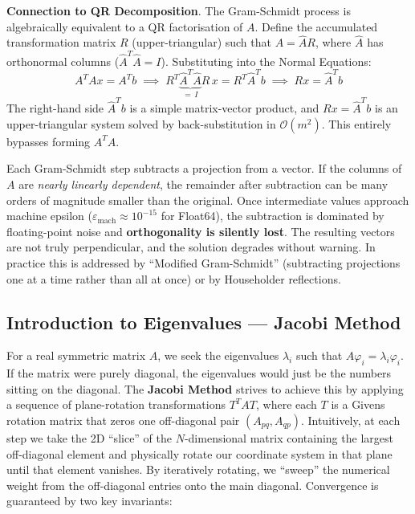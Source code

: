 \documentclass[12pt, a4paper]{article}
\begin{document}
\textbf{Connection to QR Decomposition}. The Gram-Schmidt process is algebraically equivalent to a QR factorisation of $A$. Define the accumulated transformation matrix $R$ (upper-triangular) such that $A = \hat{A} R$, where $\hat{A}$ has orthonormal columns ($\hat{A}^T \hat{A} = I$). Substituting into the Normal Equations:
\begin{equation}
A^T A x = A^T b \;\implies\; R^T \underbrace{\hat{A}^T \hat{A}}_{=\, I} R\, x = R^T \hat{A}^T b \;\implies\; Rx = \hat{A}^T b
\end{equation}
The right-hand side $\hat{A}^T b$ is a simple matrix-vector product, and $Rx = \hat{A}^T b$ is an upper-triangular system solved by back-substitution in $\mathcal{O}(m^2)$. This entirely bypasses forming $A^T A$.

\begin{tcolorbox}[colback=orange!5!white,colframe=orange!75!black,title=Numerical Stability Warning: Loss of Orthogonality]
Each Gram-Schmidt step subtracts a projection from a vector. If the columns of $A$ are \textit{nearly linearly dependent}, the remainder after subtraction can be many orders of magnitude smaller than the original. Once intermediate values approach machine epsilon ($\varepsilon_{\text{mach}} \approx 10^{-15}$ for Float64), the subtraction is dominated by floating-point noise and \textbf{orthogonality is silently lost}. The resulting vectors are not truly perpendicular, and the solution degrades without warning. In practice this is addressed by ``Modified Gram-Schmidt'' (subtracting projections one at a time rather than all at once) or by Householder reflections.
\end{tcolorbox}

\subsection{Introduction to Eigenvalues --- Jacobi Method}
\label{subsec:eigenintro}
For a real symmetric matrix $A$, we seek the eigenvalues $\lambda_i$ such that $A\varphi_i = \lambda_i \varphi_i$.
If the matrix were purely diagonal, the eigenvalues would just be the numbers sitting on the diagonal. The \textbf{Jacobi Method} strives to achieve this by applying a sequence of plane-rotation transformations $T^T A T$, where each $T$ is a Givens rotation matrix that zeros one off-diagonal pair $(A_{pq}, A_{qp})$.
Intuitively, at each step we take the 2D ``slice'' of the $N$-dimensional matrix containing the largest off-diagonal element and physically rotate our coordinate system in that plane until that element vanishes. By iteratively rotating, we ``sweep'' the numerical weight from the off-diagonal entries onto the main diagonal. Convergence is guaranteed by two key invariants:
\end{document}
